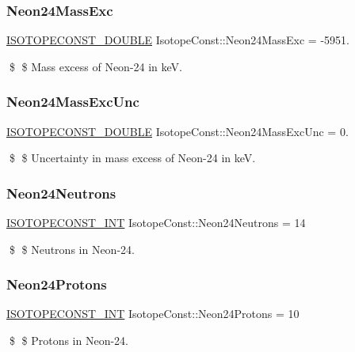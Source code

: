 \subsubsection{\texorpdfstring{Neon24\+Mass\+Exc}{Neon24MassExc}}
{\footnotesize\ttfamily \mbox{\hyperlink{group___isotope_const-_macros_ga8f45a7272ce02c0b4c65c44636ed719a}{I\+S\+O\+T\+O\+P\+E\+C\+O\+N\+S\+T\+\_\+\+D\+O\+U\+B\+LE}} Isotope\+Const\+::\+Neon24\+Mass\+Exc = -\/5951.}

\$ \$ Mass excess of Neon-\/24 in keV. \mbox{\label{group___isotope_const-_neon-_ne24_gabf29f5d33c7a7848d84fb861f9a607e4}} 
\subsubsection{\texorpdfstring{Neon24\+Mass\+Exc\+Unc}{Neon24MassExcUnc}}
{\footnotesize\ttfamily \mbox{\hyperlink{group___isotope_const-_macros_ga8f45a7272ce02c0b4c65c44636ed719a}{I\+S\+O\+T\+O\+P\+E\+C\+O\+N\+S\+T\+\_\+\+D\+O\+U\+B\+LE}} Isotope\+Const\+::\+Neon24\+Mass\+Exc\+Unc = 0.}

\$ \$ Uncertainty in mass excess of Neon-\/24 in keV. \mbox{\label{group___isotope_const-_neon-_ne24_ga00e21373d0caf452d411dfe1039107d1}} 
\subsubsection{\texorpdfstring{Neon24\+Neutrons}{Neon24Neutrons}}
{\footnotesize\ttfamily \mbox{\hyperlink{group___isotope_const-_macros_ga5f18360b3e99483a35c32d789e62621c}{I\+S\+O\+T\+O\+P\+E\+C\+O\+N\+S\+T\+\_\+\+I\+NT}} Isotope\+Const\+::\+Neon24\+Neutrons = 14}

\$ \$ Neutrons in Neon-\/24. \mbox{\label{group___isotope_const-_neon-_ne24_gae02337c192087817e1dd2062ee1c3812}} 
\subsubsection{\texorpdfstring{Neon24\+Protons}{Neon24Protons}}
{\footnotesize\ttfamily \mbox{\hyperlink{group___isotope_const-_macros_ga5f18360b3e99483a35c32d789e62621c}{I\+S\+O\+T\+O\+P\+E\+C\+O\+N\+S\+T\+\_\+\+I\+NT}} Isotope\+Const\+::\+Neon24\+Protons = 10}

\$ \$ Protons in Neon-\/24. 